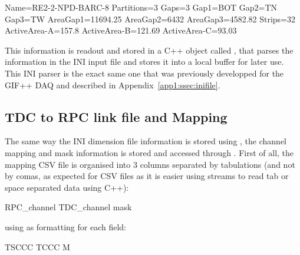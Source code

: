 	\begin{code}
	\begin{inicode}
[T1S1]
Name=RE2-2-NPD-BARC-8
Partitions=3
Gaps=3
Gap1=BOT
Gap2=TN
Gap3=TW
AreaGap1=11694.25
AreaGap2=6432
AreaGap3=4582.82
Strips=32
ActiveArea-A=157.8
ActiveArea-B=121.69
ActiveArea-C=93.03
	\end{inicode}
	\label{ini:slot}
	\vspace{5mm}
	\end{code}
	
	This information is readout and stored in a C++ object called , that parses the information in the INI input file and stores it into a local buffer for later use. This INI parser is the exact same one that was previously developped for the GIF++ DAQ and described in Appendix~\ref{app1:ssec:inifile}.
	
	\subsection{TDC to RPC link file and Mapping}
	\label{app2:ssec:mapping}
	
	The same way the INI dimension file information is stored using , the channel mapping and mask information is stored and accessed through . First of all, the mapping CSV file is organised into 3 columns separated by tabulations (and not by comas, as expected for CSV files as it is easier using streams to read tab or space separated data using C++):\\
	
	\begin{textcode}
 RPC_channel	TDC_channel	mask
	\end{textcode}
	\vspace{5mm}
	
	using as formatting for each field:\\
	
	\begin{textcode}
 TSCCC	TCCC	M
	\end{textcode}
	
